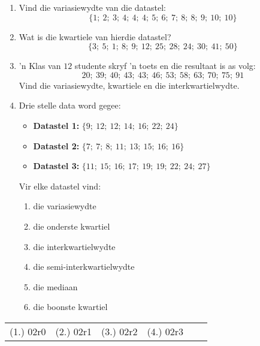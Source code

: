 \begin{exercises}{}{
  \begin{enumerate}[noitemsep, label=\textbf{\arabic*}.]

  \item Vind die variasiewydte van die datastel:
    \begin{equation*}
      \{1;\ 2;\ 3;\ 4;\ 4;\ 4;\ 5;\ 6;\ 7;\ 8;\ 8;\ 9;\ 10;\ 10\}
    \end{equation*}

  \item Wat is die kwartiele van hierdie datastel?
    \begin{equation*}
      \{3;\ 5;\ 1;\ 8;\ 9;\ 12;\ 25;\ 28;\ 24;\ 30;\ 41;\ 50\}
    \end{equation*}

  \item ’n Klas van $12$ studente skryf ’n toets en die resultaat is as volg:
    \begin{equation*}
      20;\ 39;\ 40;\ 43;\ 43;\ 46;\ 53;\ 58;\ 63;\ 70;\ 75;\ 91
    \end{equation*}
    Vind die variasiewydte, kwartiele en die interkwartielwydte.

  \item Drie stelle data word gegee:
    \begin{itemize}  
    \item \textbf{Datastel 1:} $\{9;\ 12;\ 12;\ 14;\ 16;\ 22;\ 24\}$
    \item \textbf{Datastel 2:} $\{7;\ 7;\ 8;\ 11;\ 13;\ 15;\ 16;\ 16\}$
    \item \textbf{Datastel 3:} $\{11;\ 15;\ 16;\ 17;\ 19;\ 19;\ 22;\ 24;\ 27\}$
    \end{itemize}
    Vir elke datastel vind:
    \begin{enumerate}[noitemsep, label=\textbf{(\alph*)} ]
    \item die variasiewydte
    \item die onderste kwartiel
    \item die interkwartielwydte
    \item die semi-interkwartielwydte
    \item die mediaan
    \item die boonste kwartiel
    \end{enumerate}
  \end{enumerate}
\par \practiceinfo
\par \begin{tabular}[h]{cccccc}
(1.)	02r0	&
(2.)	02r1	&
(3.)	02r2	&
(4.)	02r3	&
\end{tabular}
}
\end{exercises}

